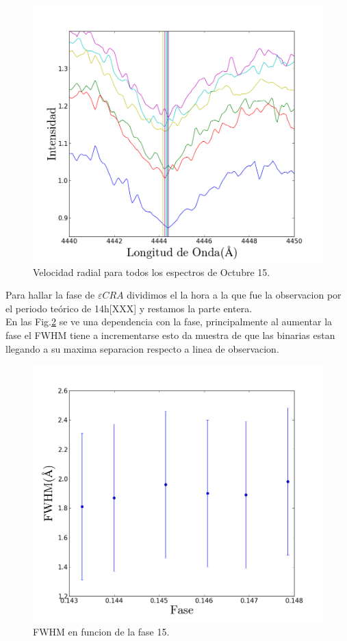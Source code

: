 \documentclass[Proceedings]{ascelike}
\begin{document}
\begin{figure}
\includegraphics[scale=0.5]{epscraEspectra.png}
\caption{Velocidad radial para todos los espectros de Octubre 15. \label{AllSpectra}}
\end{figure}

Para hallar la fase de $\varepsilon CRA$ dividimos el la hora a la que fue la observacion por el periodo te\'orico de 14h[XXX] y restamos la parte entera.\\

En las Fig.\ref{FWHM} se ve una dependencia con la fase, principalmente al aumentar la fase el FWHM tiene a incrementarse esto da muestra de que las binarias estan llegando a su maxima separacion respecto a linea de observacion.\\

\begin{figure}
\includegraphics[scale=0.5]{anchovsfase.png}
\caption{FWHM en funcion de la fase 15. \label{FWHM}}
\end{figure}
\end{document}
